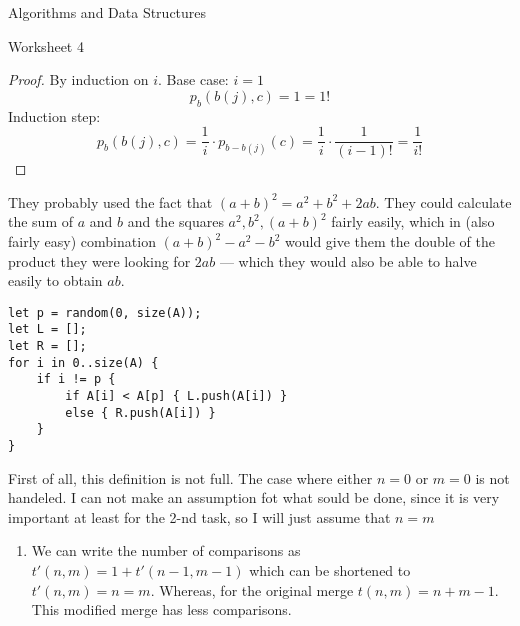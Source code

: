 \documentclass{article}
\begin{document}
    {Algorithms and Data Structures}

    \begin{center}
        \large
        Worksheet 4
    \end{center}
    \begin{tasks}
        \item {
            \begin{proof} By induction on \(i\).
                Base case: \(i = 1\)
                \begin{displaymath}
                    p_b(b(j), c) = 1 = 1!
                \end{displaymath}
                Induction step:
                \begin{displaymath}
                    p_b(b(j), c) 
                    = \frac{1}{i} \cdot p_{b-b(j)}(c)
                    = \frac{1}{i} \cdot \frac{1}{(i-1)!} 
                    = \frac{1}{i!}
                \end{displaymath}
            \end{proof}
        }
        \item {
            They probably used the fact that \((a+b)^2 = a^2 + b^2 + 2ab\). They could calculate the sum of \(a\) and \(b\) and the squares \(a^2, b^2, (a+b)^2\) fairly easily, which in (also fairly easy) combination \((a+b)^2 - a^2 - b^2\) would give them the double of the product they were looking for \(2ab\) --- which they would also be able to halve easily to obtain \(ab\).
        }
        \item {
            \begin{verbatim}
let p = random(0, size(A));
let L = [];
let R = [];
for i in 0..size(A) {
    if i != p {
        if A[i] < A[p] { L.push(A[i]) }
        else { R.push(A[i]) }
    }
}
            \end{verbatim}
        }
        \item {
            First of all, this definition is not full. The case where either \(n = 0\) or \(m = 0\) is not handeled. I can not make an assumption fot what sould be done, since it is very important at least for the 2-nd task, so I will just assume that \(n = m\)
            \begin{enumerate}[label={(\arabic*)}]
                \item {
                    We can write the number of comparisons as \(t'(n, m) = 1 + t'(n-1, m-1)\) which can be shortened to \(t'(n, m) = n = m\). Whereas, for the original merge \(t(n, m) = n + m - 1\). This modified merge has less comparisons.
}
\end{enumerate}}
\end{tasks}
\end{document}
